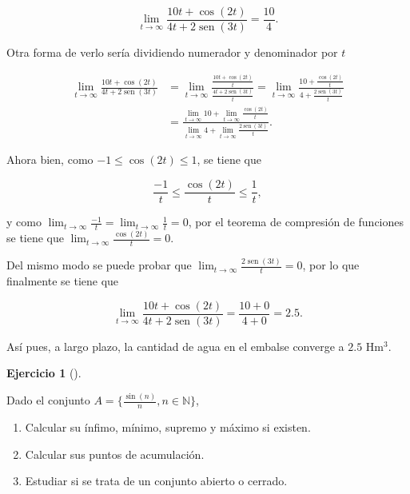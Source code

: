 \documentclass[
  a4paper,
]{scrreport}
\providecommand{\tightlist}{%
  \setlength{\itemsep}{0pt}\setlength{\parskip}{0pt}}\usepackage{longtable,booktabs,array}
\theoremstyle{definition}
\newtheorem{exercise}{Ejercicio}[chapter]
\theoremstyle{remark}
\begin{document}
\begin{tcolorbox}
\[
\lim_{t\to\infty} \frac{10t+\cos(2t)}{4t+2\operatorname{sen}(3t)} = \frac{10}{4}.
\]

Otra forma de verlo sería dividiendo numerador y denominador por \(t\)

\begin{align*}
\lim_{t\to\infty} \frac{10t+\cos(2t)}{4t+2\operatorname{sen}(3t)} 
&= \lim_{t\to\infty} \frac{\frac{10t+\cos(2t)}{t}}{\frac{4t+2\operatorname{sen}(3t)}{t}} 
= \lim_{t\to\infty} \frac{10 + \frac{\cos(2t)}{t}}{4 + \frac{2\operatorname{sen}(3t)}{t}} \\
&= \frac{\lim_{t\to\infty}10 +\lim_{t\to\infty} \frac{\cos(2t)}{t}}{\lim_{t\to\infty}4 + \lim_{t\to\infty}\frac{2\operatorname{sen}(3t)}{t}}.
\end{align*}

Ahora bien, como \(-1\leq \cos(2t)\leq 1\), se tiene que

\[
\frac{-1}{t}\leq \frac{\cos(2t)}{t}\leq \frac{1}{t},
\]

y como
\(\lim_{t\to\infty} \frac{-1}{t} = \lim_{t\to\infty} \frac{1}{t} = 0\),
por el teorema de compresión de funciones se tiene que
\(\lim_{t\to\infty} \frac{\cos(2t)}{t} = 0\).

Del mismo modo se puede probar que
\(\lim_{t\to\infty} \frac{2\operatorname{sen}(3t)}{t} =0\), por lo que
finalmente se tiene que

\[
\lim_{t\to\infty} \frac{10t+\cos(2t)}{4t+2\operatorname{sen}(3t)} 
= \frac{10+0}{4+0} = 2.5.
\]

Así pues, a largo plazo, la cantidad de agua en el embalse converge a
\(2.5\) Hm\(^3\).

\end{tcolorbox}

\begin{exercise}[]\protect\hypertarget{exr-3}{}\label{exr-3}

Dado el conjunto
\(A=\{\frac{\operatorname{sin}(n)}{n}, n\in\mathbb{N}\}\),

\begin{enumerate}
\def\labelenumi{\alph{enumi}.}
\tightlist
\item
  Calcular su ínfimo, mínimo, supremo y máximo si existen.
\item
  Calcular sus puntos de acumulación.
\item
  Estudiar si se trata de un conjunto abierto o cerrado.
\end{enumerate}

\end{exercise}
\end{document}
